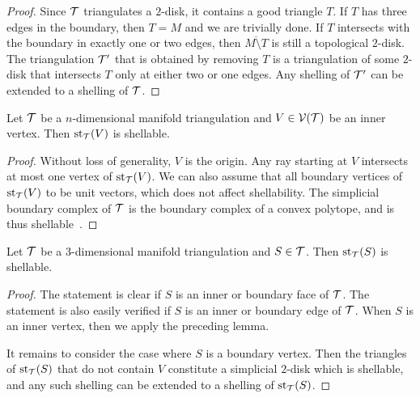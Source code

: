 \documentclass[12pt,a4paper]{article}
\begin{document}
\begin{proof}
    Since ${\mathcal T}$ triangulates a $2$-disk,
    it contains a good triangle $T$. 
    If $T$ has three edges in the boundary, then $T = M$ and we are trivially done. 
    If $T$ intersects with the boundary in exactly one or two edges, 
    then $\overline{M \setminus T}$ is still a topological $2$-disk.
    The triangulation ${\mathcal T}'$ that is obtained by removing $T$
    is a triangulation of some $2$-disk that intersects $T$ only at either two or one edges.
    Any shelling of ${\mathcal T}'$ can be extended to a shelling of ${\mathcal T}$.
%   
\end{proof}

\begin{lemma}
    Let ${\mathcal T}$ be a $n$-dimensional manifold triangulation and $V \in {\mathcal V}({\mathcal T})$ be an inner vertex.
    Then $\operatorname{st}_{{\mathcal T}}(V)$ is shellable. 
\end{lemma}
\begin{proof}
    Without loss of generality, $V$ is the origin. 
    Any ray starting at $V$ intersects at most one vertex of $\operatorname{st}_{{\mathcal T}}(V)$.
    We can also assume that all boundary vertices of $\operatorname{st}_{{\mathcal T}}(V)$ to be unit vectors,
    which does not affect shellability. 
    The simplicial boundary complex of ${\mathcal T}$ is the boundary complex of a convex polytope,
    and is thus shellable~\cite[Theorem~8.12]{ziegler2012lectures}. 
\end{proof}


\begin{lemma}
    Let ${\mathcal T}$ be a $3$-dimensional manifold triangulation and $S \in {\mathcal T}$.
    Then $\operatorname{st}_{{\mathcal T}}(S)$ is shellable. 
\end{lemma}
\begin{proof}
    The statement is clear if $S$ is an inner or boundary face of ${\mathcal T}$. 
    The statement is also easily verified if $S$ is an inner or boundary edge of ${\mathcal T}$.
    When $S$ is an inner vertex, then we apply the preceding lemma. 
    
    It remains to consider the case where $S$ is a boundary vertex. 
    Then the triangles of $\operatorname{st}_{{\mathcal T}}(S)$ that do not contain $V$ constitute a simplicial $2$-disk 
    which is shellable,
    and any such shelling can be extended to a shelling of $\operatorname{st}_{{\mathcal T}}(S)$.
\end{proof}
\end{document}
